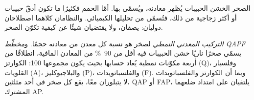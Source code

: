 الصخر الخشن الحبيبات يُظهر معادنه، ويُسمّى بها. أمّا الحمم فكثيرًا ما تكون أدقّ
حبيبات أو أكثر زجاجية من ذلك، فتُسمّى من تحليلها الكيميائي. والنظامان كلاهما
اصطلاحان دوليان: يصفان، ولا يقتضيان شيئًا عن كيفية
تكوّن الصخر.

\begin{definition}\label{def:b2:magmatic-series:qapf}
\emph{التركيب المعدني النمطي} لصخر هو نسبة كل معدن من معادنه
حجمًا. و\emph{مخطّط QAPF} يسمّي
صخرًا ناريًا خشن الحبيبات فيه أقل من \qty{90}{\percent} من المعادن المافية، انطلاقًا من
أربعة مكوّنات نمطية يُعاد حسابها بحيث يكون مجموعها 100: الكوارتز (Q)، وفلسبار القلويات
(A)، والبلاجيوكليز (P)، والفلسباتويدات (F). وبما أن الكوارتز والفلسباتويدات لا
يتبلوران معًا، يقع كل صخر في أحد مثلثين، QAP أو FAP، يلتقيان
على امتداد ضلعهما المشترك AP.
\end{definition}

